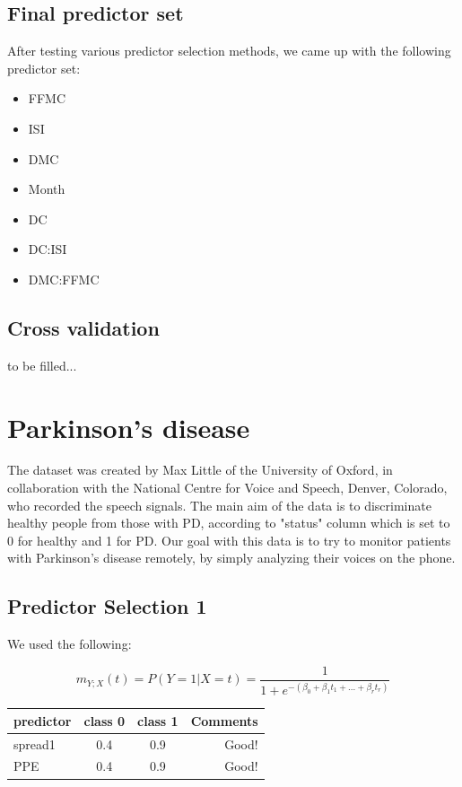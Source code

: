 \documentclass{article}
\begin{document}
\subsection{Final predictor set}

After testing various predictor selection methods, we came up with the following predictor set:
\begin{itemize}
	\item FFMC
	\item ISI
	\item DMC
	\item Month
	\item DC
	\item DC:ISI
	\item DMC:FFMC
\end{itemize}

\subsection{Cross validation}

to be filled...


\section{Parkinson's disease}

The dataset was created by Max Little of the University of Oxford, in collaboration with the
National Centre for Voice and Speech, Denver, Colorado, who recorded the speech signals. The
main aim of the data is to discriminate healthy people from those with PD, according to
"status" column which is set to 0 for healthy and 1 for PD. Our goal with this data is to
try to monitor patients with Parkinson's disease remotely, by simply analyzing their voices
on the phone.

\subsection{Predictor Selection 1}

We used the following:

\begin{equation}
\label{logit2}
m_{Y;X}(t) = P(Y = 1 | X = t) = \frac{1}{1+e^{-(\beta_0+\beta_1
t_1+...+\beta_r t_r)}}
\end{equation}

\begin{tabular}{l|c|c|r}
predictor & class 0 & class 1 & Comments \\
\hline
spread1 & 0.4 & 0.9 & Good! \\
PPE & 0.4 & 0.9 & Good! \\
\end{tabular}
\end{document}
